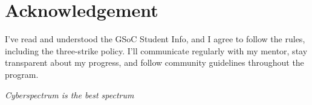 %
%
%

\section{Acknowledgement}

I've read and understood the GSoC Student Info, and I agree to follow the rules, including  the three-strike policy. I’ll communicate regularly with my mentor, stay transparent about my progress, and follow community guidelines throughout the program.

\vspace{1cm}

{
	\centering
	\textit{Cyberspectrum is the best spectrum}\par
}